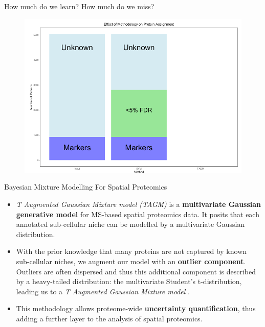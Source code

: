 \documentclass{beamer}
\theoremstyle{example}
\begin{document}
\begin{frame}{How much do we learn? How much do we miss?}
  \begin{figure}
    \includegraphics[width=.8\linewidth]{./figs/preConcludePlot.png}
  \end{figure}
\end{frame}


\begin{frame}{Bayesian Mixture Modelling For Spatial Proteomics}

  \begin{itemize}

    \item<+-> \textit{T Augmented Gaussian Mixture model (TAGM)} is a
      \textbf{multivariate Gaussian generative model} for MS-based
      spatial proteomics data. It posits that each annotated
      sub-cellular niche can be modelled by a multivariate Gaussian
      distribution.

    \item<+-> With the prior knowledge that many proteins are not
      captured by known sub-cellular niches, we augment our model with
      an \textbf{outlier component}. Outliers are often dispersed and
      thus this additional component is described by a heavy-tailed
      distribution: the multivariate Student's t-distribution, leading
      us to a \textit{T Augmented Gaussian Mixture model}
      \citep{Crook:2018,Crook:2019}.

    \item<+-> This methodology allows proteome-wide
      \textbf{uncertainty quantification}, thus adding a further layer
      to the analysis of spatial proteomics.

  \end{itemize}
\end{frame}
\end{document}
